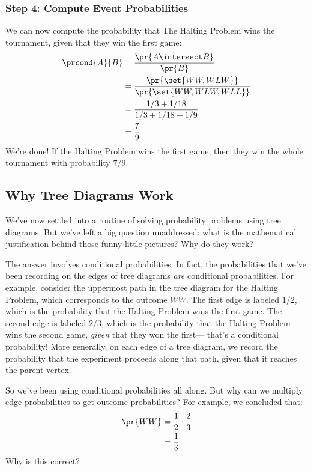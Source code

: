 \subsubsection*{Step 4: Compute Event Probabilities}

We can now compute the probability that The Halting Problem wins the
tournament, given that they win the first game:
%
\begin{align*}
\prcond{A}{B}
    & = \frac{\pr{A \intersect B}}{\pr{B}} \\
    & = \frac{\pr{\set{WW, WLW}}}{\pr{\set{WW, WLW, WLL}}} \\
    & = \frac{1/3 + 1/18}{1/3 + 1/18 + 1/9} \\
    & = \frac{7}{9}
\end{align*}
%
We're done!  If the Halting Problem wins the first game, then they win
the whole tournament with probability $7 / 9$.  


\subsection{Why Tree Diagrams Work}

We've now settled into a routine of solving probability problems using
tree diagrams.  But we've left a big question unaddressed: what is the
mathematical justification behind those funny little pictures?  Why do
they work?

The answer involves conditional probabilities.  In fact, the
probabilities that we've been recording on the edges of tree diagrams
\textit{are} conditional probabilities.  For example, consider the
uppermost path in the tree diagram for the Halting Problem, which
corresponds to the outcome $WW$.  The first edge is labeled $1/2$,
which is the probability that the Halting Problem wins the first game.
The second edge is labeled $2 / 3$, which is the probability that the
Halting Problem wins the second game, \textit{given} that they won the
first--- that's a conditional probability!  More generally, on each
edge of a tree diagram, we record the probability that the experiment
proceeds along that path, given that it reaches the parent vertex.

So we've been using conditional probabilities all along.  But why can
we multiply edge probabilities to get outcome probabilities?  For
example, we concluded that:
%
\begin{align*}
\pr{WW} & = \frac{1}{2} \cdot \frac{2}{3} \\
	& = \frac{1}{3}
\end{align*}
%
Why is this correct?

